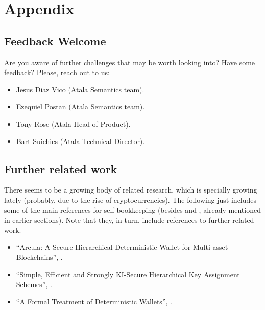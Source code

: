 \section{Appendix}

\subsection{Feedback Welcome}

Are you aware of further challenges that may be worth looking into? Have some
feedback? Please, reach out to us:

\begin{itemize}
\item Jesus Diaz Vico (Atala Semantics team).	
\item Ezequiel Postan (Atala Semantics team).
\item Tony Rose (Atala Head of Product).
\item Bart Suichies (Atala Technical Director).
\end{itemize}

\subsection{Further related work}

There seems to be a growing body of related research, which is specially
growing lately (probably, due to the rise of cryptocurrencies). The following
just includes some of the main references for self-bookkeeping (besides
\cite{kkl20} and \cite{def+21}, already mentioned in earlier sections). Note
that they, in turn, include references to further related work.

\begin{itemize}
\item ``Arcula: A Secure Hierarchical Deterministic Wallet for Multi-asset
  Blockchains'', \cite{lfa20}.
\item ``Simple, Efficient and Strongly KI-Secure Hierarchical Key Assignment
  Schemes'', \cite{fpp13}.
\item ``A Formal Treatment of Deterministic Wallets'', \cite{dfl19}.
\end{itemize}


